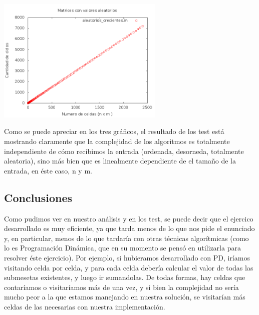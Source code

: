 \begin {center}
\includegraphics[width=8cm]{./graficos/aleatoriosCrecientes.png}
\end {center}

Como se puede apreciar en los tres gráficos, el resultado de los test está mostrando claramente que la complejidad de los algoritmos es totalmente independiente de cómo recibimos la entrada (ordenada, desorneda, totalmente aleatoria), sino más bien que es linealmente dependiente de el tamaño de la entrada, en éste caso, n y m. \\

\subsection{Conclusiones}
Como pudimos ver en nuestro análisis y en los test, se puede decir que el ejercico desarrollado es muy eficiente, ya que tarda menos de lo que nos pide el enunciado y, en particular, menos de lo que tardaría con otras técnicas algorítmicas (como lo es Programación Dinámica, que en su momento se pensó en utilizarla para resolver éste ejercicio). Por ejemplo, si hubieramos desarrollado con PD, iríamos visitando celda por celda, y para cada celda debería calcular el valor de todas las submesetas existentes, y luego ir sumandolas. De todas formas, hay celdas que contaríamos o visitaríamos más de una vez, y si bien la complejidad no sería mucho peor a la que estamos manejando en nuestra solución, se visitarían más celdas de las necesarias con nuestra implementación. \\
